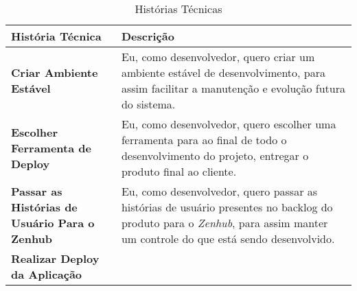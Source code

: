 \begin{table}[H]
	\begin{tabular}{|p{5.0cm}|p{10.0cm}|} 
	\hline
	\textbf{História Técnica} & \textbf{Descrição} \\ \hline
	\textbf{Criar Ambiente Estável} & Eu, como desenvolvedor, quero criar um ambiente estável de desenvolvimento, para assim facilitar a manutenção e evolução futura do sistema. \\ \hline
	\textbf{Escolher Ferramenta de Deploy} & Eu, como desenvolvedor, quero escolher uma ferramenta para ao final de todo o desenvolvimento do projeto, entregar o produto final ao cliente. \\ \hline
	\textbf{Passar as Histórias de Usuário Para o Zenhub} & Eu, como desenvolvedor, quero passar as histórias de usuário presentes no backlog do produto para o \textit{Zenhub}, para assim manter um controle do que está sendo desenvolvido. \\ \hline
	\textbf{Realizar Deploy da Aplicação}
	\end{tabular}
	 \caption{Histórias Técnicas}
	 \label{tab:historias_tecnicas}
\end{table}